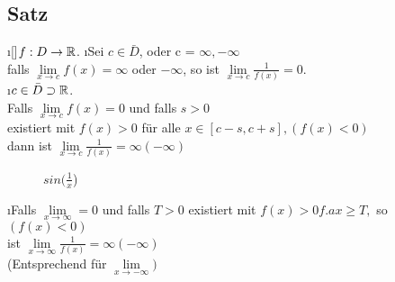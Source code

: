 \subsection[Satz: Grenzwerte gegen unendlich]{Satz}\label{sec:4.16}
\begin{enumerate}[a)]
\i[]$f : D \rightarrow \mathbb{R}$.
\i Sei $c \in \bar{D}$, oder c = $\infty, - \infty $\\
falls $\lim\limits_{x \rightarrow c} f(x) = \infty$ oder $-\infty$, so ist $\lim\limits_{x \rightarrow c} \frac{1}{f(x)} = 0.$\\
\i $c \in \bar{D} \supset \mathbb{R}$.\\
Falls $\lim\limits_{x \rightarrow c} f(x) = 0$ und falls $s > 0$\\
existiert mit $f(x) > 0$ für alle $x \in [c-s,c+s], (f(x) < 0)$ \\
dann ist $\lim\limits_{x \rightarrow c} \frac{1}{f(x)} = \infty (-\infty)$
\begin{figure*}[h!]
\centering
{}
\caption{$sin(\frac{1}{x}$)}
\end{figure*}
\i Falls $\lim\limits_{x \rightarrow \infty} =0$ und falls $T >0$ existiert mit $f(x) > 0 f.a x \geq T ,$ so $(f(x) < 0)$\\
ist $\lim\limits_{x \rightarrow \infty} \frac{1}{f(x)} = \infty (- \infty)$\\
(Entsprechend für $\lim\limits_{x \rightarrow - \infty})$
\end{enumerate}
